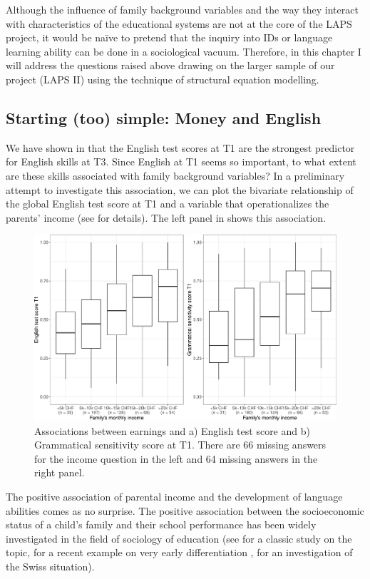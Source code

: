\documentclass[output=paper]{langsci/langscibook}
\begin{document}
Although the influence of family background variables and the way they interact with characteristics of the educational systems are not at the core of the LAPS project, it would be naïve to pretend that the inquiry into IDs or language learning ability can be done in a sociological vacuum. Therefore, in this chapter I will address the questions raised above drawing on the larger sample of our project (LAPS II) using the technique of structural equation modelling.

\subsection{Starting (too) simple: Money and English}

We have shown in  that the English test scores at T1 are the strongest predictor for English skills at T3. Since English at T1 seems so important, to what extent are these skills associated with family background variables? In a preliminary attempt to investigate this association, we can plot the bivariate relationship of the global English test score at T1 and a variable that operationalizes the parents’ income (see  for details). The left panel in  shows this association.

  
\begin{figure}
\includegraphics[width=\textwidth]{figures/Figure5.1.pdf}
\caption{Associations between earnings and a) English test score and b) Grammatical sensitivity score at T1. There are 66 missing answers for the income question in the left and 64 missing answers in the right panel.\label{fig:05:1}}
\end{figure}

The positive association of parental income and the development of language abilities comes as no surprise. The positive association between the socioeconomic status of a child’s family and their school performance has been widely investigated in the field of sociology of education (see \citealt{EntwisleAlexander1992} for a classic study on the topic, \citealt{FernaldEtAl2013} for a recent example on very early differentiation , \citealt{HäberlinEtAl2005} for an investigation of the Swiss situation).
\end{document}
